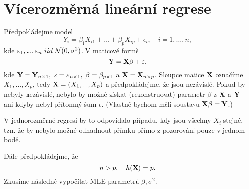 \section{Vícerozměrná lineární regrese}
Předpokládejme model
$$Y_i=\beta_1X_{i1}+\ldots+\beta_pX_{ip}+\epsilon_i, \quad i=1,\ldots,n, $$
kde $\varepsilon_1,...,\varepsilon_n~iid~\mathcal{N}(0,\sigma^2)$.
V maticové formě
$$\textbf{Y}=\textbf{X}\beta+\varepsilon,$$
kde $\textbf{Y}=\textbf{Y}_{n\times 1},~\varepsilon=\varepsilon_{n\times 1},~\beta=\beta_{p\times 1}$ a $\textbf{X}=\textbf{X}_{n\times p}$. Sloupce matice $\textbf{X}$ označíme $X_1,...,X_p$, tedy $\textbf{X}=(X_1,...,X_p) $ a předpokládejme, že jsou nezávislé. Pokud by nebyly nezávislé, nebylo by možné získat (rekonstruovat) parametr $\beta$ z $\textbf{X}$ a $\textbf{Y}$ ani kdyby nebyl přítomný šum $\epsilon$. (Vlastně bychom měli soustavu $\textbf{X}\beta=\textbf{Y}$.)\\
\begin{remark}
V jednorozměrné regresi by to odpovídalo případu, kdy jsou všechny $X_i$ stejné, tzn. že by nebylo možné odhadnout přímku přímo z pozorování pouze v jednom bodě.
\end{remark}
Dále předpokládejme, že
$$n>p, \quad h(\textbf{X})=p.$$
Zkusíme následně vypočítat MLE parametrů $\beta, \sigma^2$.
